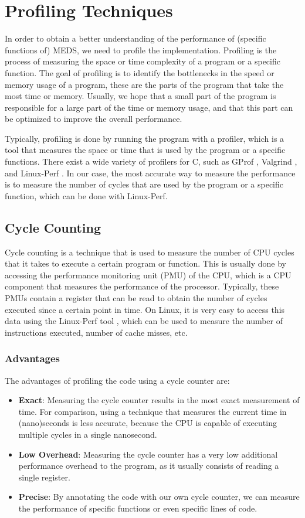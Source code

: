 \documentclass[11pt,a4paper]{report}
\theoremstyle{definition}
\begin{document}
\section{Profiling Techniques}
In order to obtain a better understanding of the performance of (specific functions of) MEDS, we need to profile the implementation. Profiling is the process of measuring the space or time complexity of a program or a specific function. The goal of profiling is to identify the bottlenecks in the speed or memory usage of a program, these are the parts of the program that take the most time or memory. Usually, we hope that a small part of the program is responsible for a large part of the time or memory usage, and that this part can be optimized to improve the overall performance.

Typically, profiling is done by running the program with a profiler, which is a tool that measures the space or time that is used by the program or a specific functions. There exist a wide variety of profilers for C, such as GProf \cite{graham1982gprof}, Valgrind \cite{nethercote2007valgrind}, and Linux-Perf \cite{de2010new}. In our case, the most accurate way to measure the performance is to measure the number of cycles that are used by the program or a specific function, which can be done with Linux-Perf.

\subsection{Cycle Counting}
Cycle counting is a technique that is used to measure the number of CPU cycles that it takes to execute a certain program or function. This is usually done by accessing the performance monitoring unit (PMU) of the CPU, which is a CPU component that measures the performance of the processor. Typically, these PMUs contain a register that can be read to obtain the number of cycles executed since a certain point in time. On Linux, it is very easy to access this data using the Linux-Perf tool \cite{de2010new}, which can be used to measure the number of instructions executed, number of cache misses, etc.

\subsubsection{Advantages}
The advantages of profiling the code using a cycle counter are:
\begin{itemize}
  \item \textbf{Exact}: Measuring the cycle counter results in the most exact measurement of time. For comparison, using a technique that measures the current time in (nano)seconds is less accurate, because the CPU is capable of executing multiple cycles in a single nanosecond.
  \item \textbf{Low Overhead}: Measuring the cycle counter has a very low additional performance overhead to the program, as it usually consists of reading a single register.
  \item \textbf{Precise}: By annotating the code with our own cycle counter, we can measure the performance of specific functions or even specific lines of code.
\end{itemize}
\end{document}
